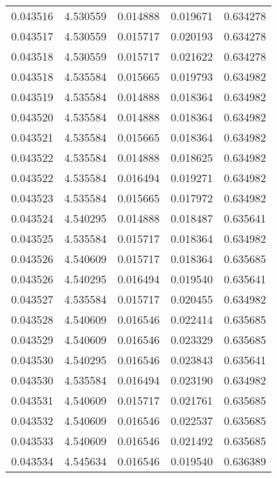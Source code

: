\begin{tabular}{lrrrr}
0.043516    &  4.530559 &  0.014888 &  0.019671 &             0.634278 \\
0.043517    &  4.530559 &  0.015717 &  0.020193 &             0.634278 \\
0.043518    &  4.530559 &  0.015717 &  0.021622 &             0.634278 \\
0.043518    &  4.535584 &  0.015665 &  0.019793 &             0.634982 \\
0.043519    &  4.535584 &  0.014888 &  0.018364 &             0.634982 \\
0.043520    &  4.535584 &  0.014888 &  0.018364 &             0.634982 \\
0.043521    &  4.535584 &  0.015665 &  0.018364 &             0.634982 \\
0.043522    &  4.535584 &  0.014888 &  0.018625 &             0.634982 \\
0.043522    &  4.535584 &  0.016494 &  0.019271 &             0.634982 \\
0.043523    &  4.535584 &  0.015665 &  0.017972 &             0.634982 \\
0.043524    &  4.540295 &  0.014888 &  0.018487 &             0.635641 \\
0.043525    &  4.535584 &  0.015717 &  0.018364 &             0.634982 \\
0.043526    &  4.540609 &  0.015717 &  0.018364 &             0.635685 \\
0.043526    &  4.540295 &  0.016494 &  0.019540 &             0.635641 \\
0.043527    &  4.535584 &  0.015717 &  0.020455 &             0.634982 \\
0.043528    &  4.540609 &  0.016546 &  0.022414 &             0.635685 \\
0.043529    &  4.540609 &  0.016546 &  0.023329 &             0.635685 \\
0.043530    &  4.540295 &  0.016546 &  0.023843 &             0.635641 \\
0.043530    &  4.535584 &  0.016494 &  0.023190 &             0.634982 \\
0.043531    &  4.540609 &  0.015717 &  0.021761 &             0.635685 \\
0.043532    &  4.540609 &  0.016546 &  0.022537 &             0.635685 \\
0.043533    &  4.540609 &  0.016546 &  0.021492 &             0.635685 \\
0.043534    &  4.545634 &  0.016546 &  0.019540 &             0.636389 \\

\end{tabular}
